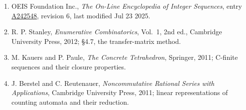 \documentclass[11pt]{article}
\theoremstyle{definition}
\begin{document}
\begin{enumerate}

\item OEIS Foundation Inc., \emph{The On-Line Encyclopedia of Integer Sequences}, entry \href{https://oeis.org/A242548}{A242548}, revision 6, last modified Jul 23 2025.

\item R. P. Stanley, \emph{Enumerative Combinatorics}, Vol.~1, 2nd ed., Cambridge University Press, 2012; \S4.7, the transfer-matrix method.

\item M. Kauers and P. Paule, \emph{The Concrete Tetrahedron}, Springer, 2011; C-finite sequences and their closure properties.

\item J. Berstel and C. Reutenauer, \emph{Noncommutative Rational Series with Applications}, Cambridge University Press, 2011; linear representations of counting automata and their reduction.

\end{enumerate}
\end{document}
